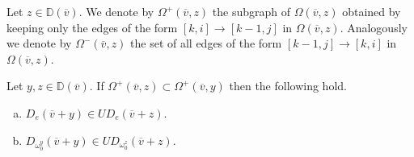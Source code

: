 \documentclass[11pt,fleqn]{amsart}
\newcommand\vv{\overline{v}}
\newcommand\DD{\mathbb D}
\begin{document}
Let $z \in \DD(\vv)$. We denote by $\Omega^+(\vv, z)$ the subgraph of 
$\Omega(\vv,z)$ obtained by keeping only the edges of the form $[k,i] 
\rightarrow [k-1,j]$ in $\Omega(\vv, z)$. Analogously we denote by 
$\Omega^-(\vv, z)$ the set of all edges of the form $[k-1,j] \rightarrow 
[k,i]$ in $\Omega(\vv, z)$. 

\begin{Lemma}
\label{L:omega-contained}
Let $y,z \in \DD(\vv)$. If $\Omega^+(\vv,z) \subset \Omega^+(\vv,y)$ then the
following hold.
\begin{enumerate}[(a)]
\item 
\label{i:e}
$D_{e}(\vv + y) \in U D_{e}(\vv + z)$.

\item 
\label{i:omega}
$D_{\omega_0^y}(\vv + y) \in U D_{\omega_0^z}(\vv + z)$.
\end{enumerate}
\end{Lemma}
\end{document}
